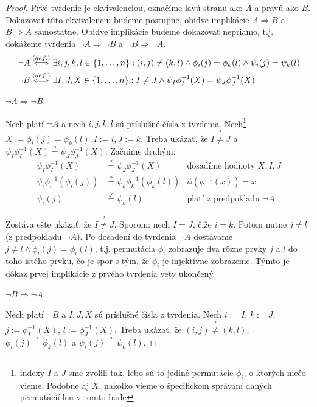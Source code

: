 \begin{proof}
Prvé tvrdenie je ekvivalenciou, označíme ľavú stranu ako $A$ a pravú ako $B$. 
Dokazovať túto ekvivalenciu budeme postupne, obidve implikácie $A \Longrightarrow B$ a $B \Longrightarrow A$ samostatne.
Obidve implikácie budeme dokazovať nepriamo, t.j. dokážeme tvrdenia $\neg A \Longrightarrow \neg B$ a $\neg B \Longrightarrow \neg A$.
\begin{align*}
\neg A &\overset{(def.)}{\Longleftrightarrow} \exists i, j, k, l \in \left\{1, \ldots, n\right\}: (i, j) \neq (k, l) \wedge \phi_i(j) = \phi_k(l) \wedge \psi_i(j) = \psi_k(l)\\
\neg B &\overset{(def.)}{\Longleftrightarrow} \exists I, J, X \in \left\{1, \ldots, n\right\}: I \neq J \wedge \psi_I\phi_I^{-1}(X) = \psi_J \phi_J^{-1}(X)    
\end{align*}

\noindent$\neg A \Longrightarrow \neg B$:

Nech platí $\neg A$ a nech $i,j,k,l$ sú príslušné čísla z tvrdenia.
Nech\footnote{indexy $I$ a $J$ sme zvolili tak, lebo sú to jediné permutácie $\phi_i$, o ktorých niečo vieme. Podobne aj $X$, nakoľko vieme o špecifickom správaní daných permutácií len v tomto bode} $X := \phi_i(j) = \phi_k(l), I := i, J := k$.
Treba ukázať, že $I \overset{?}{\neq} J$ a $\psi_I\phi_I^{-1}(X) \overset{?}{=} \psi_J \phi_J^{-1}(X)$.
Začnime druhým:
\begin{align*}
\psi_I\phi_I^{-1}(X) &\overset{?}{=} \psi_J \phi_J^{-1}(X) &\text{dosadíme hodnoty $X, I, J$}\\
\psi_i \phi_i^{-1}(\phi_i(j)) &\overset{?}{=} \psi_k \phi_k^{-1}(\phi_k(l)) &\text{$\phi(\phi^{-1}(x)) = x$}\\
\psi_i(j) &\overset{\checkmark}{=} \psi_k(l) &\text{platí z predpokladu $\neg A$}
\end{align*}

Zostáva ešte ukázať, že $I \overset{?}{\neq} J$. Sporom: nech $I = J$, čiže $i = k$. 
Potom nutne $j \neq l$ (z predpokladu $\neg A$).
Po dosadení do tvrdenia $\neg A$ dostávame $j \neq l \wedge \phi_i(j) = \phi_i(l)$, t.j. permutácia $\phi_i$ zobrazuje dva rôzne prvky $j$ a $l$ do toho istého prvku, čo je spor s tým, že $\phi_i$ je injektívne zobrazenie.
Týmto je dôkaz prvej implikácie z prvého tvrdenia vety ukončený.

\noindent$\neg B \Longrightarrow \neg A$:

Nech platí $\neg B$ a $I, J, X$ sú príslušné čísla z tvrdenia.
Nech $i := I$, $k := J$, $j := \phi_I^{-1}(X)$, $l := \phi_J^{-1}(X)$.
Treba ukázať, že $(i, j) \overset{?}{\neq} (k, l)$, $\phi_i(j) \overset{?}{=} \phi_k(l)$ a $\psi_i(j) \overset{?}{=} \psi_k(l)$.


\end{proof}
